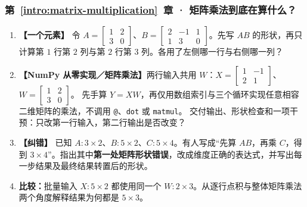 \subsubsection*{第~\ref*{intro:matrix-multiplication}~章 · 矩阵乘法到底在算什么？}
\begin{enumerate}[label={},leftmargin=4.8em,itemsep=4pt]
\item[\textbf{C-029.}] \leavevmode{}\label{exercise:C-029}\label{exercise:matrix-single-entry}\textbf{【一个元素】} 令 $A=\begin{bmatrix}1&2\\3&0\end{bmatrix}$、$B=\begin{bmatrix}2&-1&1\\1&3&0\end{bmatrix}$。先写 $AB$ 的形状，再只计算第 $1$ 行第 $2$ 列与第 $2$ 行第 $3$ 列。各用了左侧哪一行与右侧哪一列？
\item[\textbf{C-030.}] \leavevmode{}\label{exercise:C-030}\label{exercise:matrix-batch-calculation}\textbf{【NumPy 从零实现／矩阵乘法】}两行输入共用 $W$：$X=\begin{bmatrix}1&-1\\2&1\end{bmatrix}$、$W=\begin{bmatrix}1&2\\3&0\end{bmatrix}$。
先手算 $Y=XW$，再仅用数组索引与三个循环实现任意相容二维矩阵的乘法，不调用 \texttt{@}、\texttt{dot} 或 \texttt{matmul}。
交付输出、形状检查和一项干预：只改第一行输入，第二行输出是否改变？
\item[\textbf{C-031.}] \leavevmode{}\label{exercise:C-031}\label{exercise:matrix-shape-correction}\textbf{【纠错】} 已知 $A:3\times2$、$B:5\times2$、$C:5\times4$。有人写成“先算 $AB$，再乘 $C$，得到 $3\times4$”。指出其中\textbf{第一处矩阵形状错误}，改成维度正确的表达式，并写出每一步结果及最终结果转置后的形状。
\item[\textbf{C-032.}] \leavevmode{}\label{exercise:C-032}\label{exercise:batch-matrix-sharing}\textbf{比较：}批量输入 $X:5\times2$ 都使用同一个 $W:2\times3$。从逐行点积与整体矩阵乘法两个角度解释结果为何都是 $5\times3$。

\end{enumerate}
